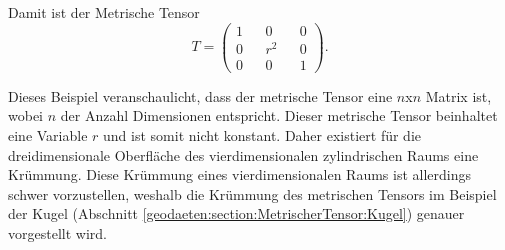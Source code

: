 Damit ist der Metrische Tensor 
\begin{equation}
	T = \begin{pmatrix} 1 && 0 && 0 \\ 0 && r^2 && 0 \\ 0 && 0 && 1 \end{pmatrix} .
\end{equation}

Dieses Beispiel veranschaulicht, dass der metrische Tensor eine $n$x$n$ Matrix ist, wobei $n$ der Anzahl Dimensionen entspricht.
Dieser metrische Tensor beinhaltet eine Variable $r$ und ist somit nicht konstant. 
Daher existiert für die dreidimensionale Oberfläche des vierdimensionalen zylindrischen Raums eine Krümmung.
Diese Krümmung eines vierdimensionalen Raums ist allerdings schwer vorzustellen, weshalb die Krümmung des metrischen Tensors im Beispiel der Kugel (Abschnitt \ref{geodaeten:section:MetrischerTensor:Kugel}) genauer vorgestellt wird.
